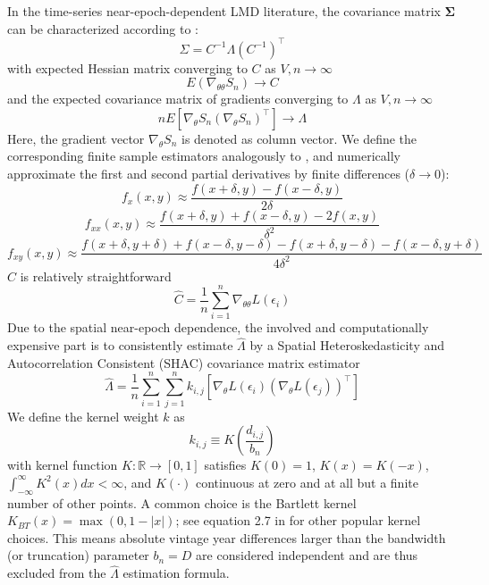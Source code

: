 \documentclass[12pt]{article}
\begin{document}
In the time-series near-epoch-dependent LMD literature, the covariance matrix $\mathbf{\Sigma}$ can be characterized according to \citet[Theorem 11.2.b, Theorem H.1]{PP97}:
\[
{\Sigma} = C^{-1} \Lambda (C^{-1})^\top
\]
with expected Hessian matrix converging to $C$ as $V,n \to \infty$
\[
E 
\left(
\nabla_{\theta \theta} S_n
\right)
\to C
\]
and the expected covariance matrix of gradients converging to $\Lambda$ as $V,n \to \infty$
\[
n E 
\left[
\nabla_{\theta} S_n
(\nabla_{\theta} S_n)^\top
\right]
\to \Lambda
\]
Here, the gradient vector $\nabla_{\theta} S_n$ is denoted as column vector.
We define the corresponding finite sample estimators analogously to \citet[Chapters 12, 13.1]{PP97}, and numerically approximate the first and second partial derivatives by finite differences ($\delta \to 0$): 
\[
f_{x}(x,y) \approx \frac{f(x+\delta,y) - f(x-\delta,y)}{2\delta}
\]
\[
f_{xx}(x,y) \approx \frac{f(x+\delta,y) + f(x-\delta,y) - 2  f(x,y)}{\delta^2}
\]
\[
f_{xy}(x,y) \approx \frac{f(x+\delta,y+\delta) + f(x-\delta,y-\delta) -  f(x+\delta,y-\delta) - f(x-\delta,y+\delta)}{4\delta^2}
\]
$\hat{C}$ is relatively straightforward
\[
\hat{C} = \frac{1}{n} \sum_{i=1}^n \nabla_{\theta \theta} L \left( \epsilon_i \right)
\]
Due to the spatial near-epoch dependence, the involved and computationally expensive part is to consistently estimate $\hat{\Lambda}$ by a Spatial Heteroskedasticity and Autocorrelation Consistent (SHAC) covariance matrix estimator \cite[equation 2]{KS11}
\begin{equation}
\label{eq:hac}
\hat{\Lambda} = \frac{1}{n} \sum_{i=1}^n \sum_{j=1}^n
k_{i,j}
\left[
\nabla_{\theta} L \left( \epsilon_i \right)
\left(
\nabla_{\theta} L \left( \epsilon_j \right)
\right)^\top
\right]
\end{equation}
We define the kernel weight $k$ as
\[
k_{i,j} \equiv K \left( \frac{d_{i,j}}{b_n} \right)
\]
with kernel function $K: \mathbb{R} \to [0,1]$ satisfies $K(0)=1$, $K(x)=K(-x)$, $\int_{-\infty}^{\infty} K^2(x) dx < \infty$, and $K(\cdot)$ continuous at zero and at all but a finite number of other points.
A common choice is the Bartlett kernel $K_{BT}(x)= \max(0, 1-|x|)$; see equation 2.7 in \cite{A91} for other popular kernel choices.
This means absolute vintage year differences larger than the bandwidth (or truncation) parameter $b_n=D$ are considered independent and are thus excluded from the $\hat{\Lambda}$ estimation formula.
\end{document}
